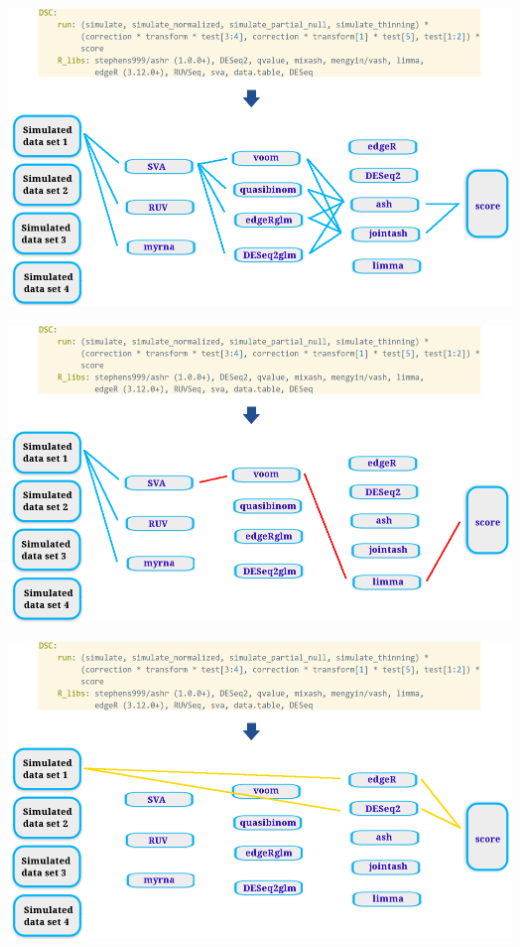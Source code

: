 \begin{withoutheadline}
\begin{frame}
  \centering \includegraphics[width=\textwidth]{figs/dsc3}
\end{frame}
\end{withoutheadline}
\begin{withoutheadline}
\begin{frame}
  \centering \includegraphics[width=\textwidth]{figs/dsc4}
\end{frame}
\end{withoutheadline}
\begin{withoutheadline}
\begin{frame}
  \centering \includegraphics[width=\textwidth]{figs/dsc5}
\end{frame}
\end{withoutheadline}
